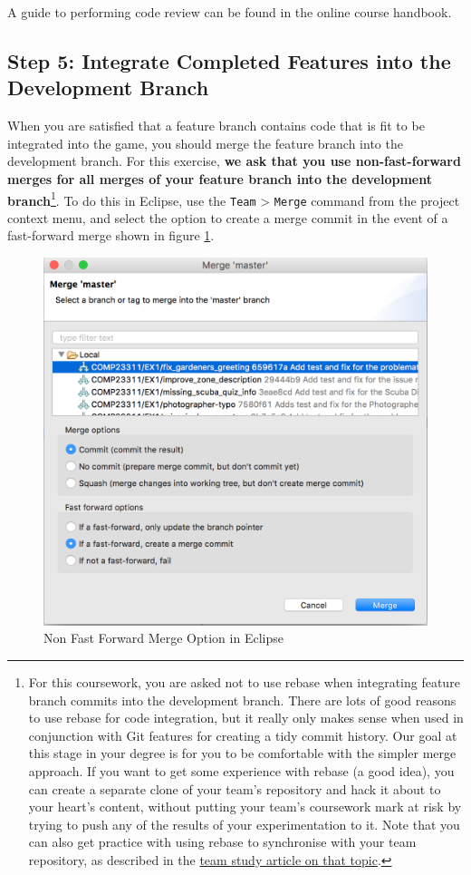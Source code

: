 \documentclass[
]{book}
\begin{document}
A guide to performing code review can be found in the online course handbook.

\hypertarget{devbranch}{%
\subsection{Step 5: Integrate Completed Features into the Development Branch}\label{devbranch}}

When you are satisfied that a feature branch contains code that is fit to be integrated into the game, you should merge the feature branch into the development branch. For this exercise, \textbf{we ask that you use non-fast-forward merges for all merges of your feature branch into the development branch}\footnote{For this coursework, you are asked not to use rebase when integrating feature branch commits into the development branch. There are lots of good reasons to use rebase for code integration, but it really only makes sense when used in conjunction with Git features for creating a tidy commit history. Our goal at this stage in your degree is for you to be comfortable with the simpler merge approach. If you want to get some experience with rebase (a good idea), you can create a separate clone of your team's repository and hack it about to your heart's content, without putting your team's coursework mark at risk by trying to push any of the results of your experimentation to it. Note that you can also get practice with using rebase to synchronise with your team repository, as described in the \href{https://software-eng.netlify.app/syncing.html}{team study article on that topic}.}. To do this in Eclipse, use the \texttt{Team} \textgreater{} \texttt{Merge} command from the project context menu, and select the option to create a merge commit in the event of a fast-forward merge shown in figure \ref{fig:NonFFMergeOption-fig}.

\begin{figure}

{\centering \includegraphics[width=0.8\linewidth]{images/NonFFMergeOption} 

}

\caption{Non Fast Forward Merge Option in Eclipse}\label{fig:NonFFMergeOption-fig}
\end{figure}
\end{document}
